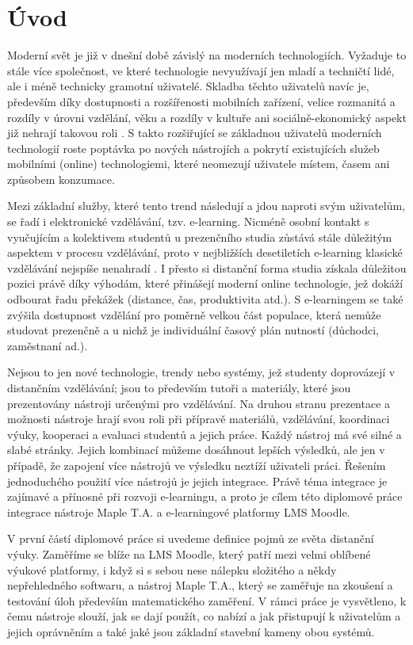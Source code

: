 \documentclass[
print,
  11pt,
  table,   
  nolof,    
  nolot,
  oneside,
  final
]{fithesis3}
\begin{document}
\chapter{Úvod}


Moderní svět je již v dnešní době závislý na moderních technologiích. Vyžaduje to stále více společnost, ve které technologie nevyužívají jen mladí a techničtí lidé, ale i méně technicky gramotní uživatelé. Skladba těchto uživatelů navíc je, především díky dostupnosti a rozšířenosti mobilních zařízení, velice rozmanitá a rozdíly v úrovni vzdělání, věku a rozdíly v kultuře ani sociálně-ekonomický aspekt již nehrají takovou roli \cite{itustats}. S takto rozšiřující se základnou uživatelů moderních technologií roste poptávka po nových nástrojích a pokrytí existujících služeb mobilními (online) technologiemi, které neomezují uživatele místem, časem ani způsobem konzumace.


Mezi základní služby, které tento trend následují a jdou naproti svým uživatelům, se řadí i elektronické vzdělávání, tzv. e-learning. Nicméně osobní kontakt s vyučujícím a kolektivem studentů u prezenčního studia zůstává stále důležitým aspektem v procesu vzdělávání, proto v nejbližších desetiletích e-learning klasické vzdělávání nejspíše nenahradí \cite{techvsteach}. I přesto si distanční forma studia získala důležitou pozici právě díky výhodám, které přinášejí moderní online technologie, jež dokáží odbourat řadu překážek (distance, čas, produktivita atd.). S e-learningem se také zvýšila dostupnost vzdělání pro poměrně velkou část populace, která nemůže studovat prezenčně a u nichž je individuální časový plán nutností (důchodci, zaměstnaní ad.).

Nejsou to jen nové technologie, trendy nebo systémy, jež studenty doprovázejí v distančním vzdělávání; jsou to především tutoři a materiály, které jsou prezentovány nástroji určenými pro vzdělávání. Na druhou stranu prezentace a možnosti nástroje hrají svou roli při přípravě materiálů, vzdělávání, koordinaci výuky, kooperaci a evaluaci studentů a jejich práce. Každý nástroj má své silné a slabé stránky. Jejich kombinací můžeme dosáhnout lepších výsledků, ale jen v případě, že zapojení více nástrojů ve výsledku neztíží uživateli práci. Řešením jednoduchého použití více nástrojů je jejich integrace. Právě téma integrace je zajímavé a přínosné při rozvoji e-learningu, a proto je cílem této diplomové práce integrace nástroje Maple T.A. a e-learningové platformy LMS Moodle.

V první částí diplomové práce si uvedeme definice pojmů ze světa distanční výuky. Zaměříme se blíže na LMS Moodle, který patří mezi velmi oblíbené výukové platformy, i když si s sebou nese nálepku složitého a někdy nepřehledného softwaru, a nástroj Maple T.A., který se zaměřuje na zkoušení a testování úloh především matematického zaměření. V rámci práce je vysvětleno, k čemu nástroje slouží, jak se dají použít, co nabízí a jak přistupují k uživatelům a jejich oprávněním a také jaké jsou základní stavební kameny obou systémů.
\end{document}
